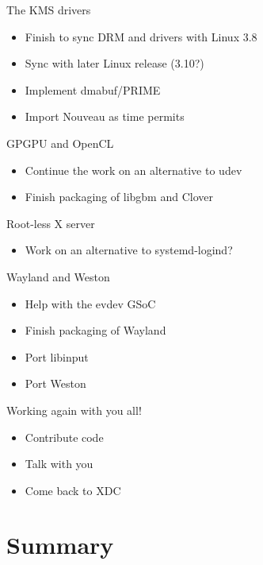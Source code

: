 \documentclass{beamer}
\begin{document}
\begin{frame}{The KMS drivers}
  \begin{itemize}
    \item Finish to sync DRM and drivers with Linux 3.8
    \item Sync with later Linux release (3.10?)
    \item Implement dmabuf/PRIME
    \item Import Nouveau as time permits
  \end{itemize}
\end{frame}

\begin{frame}{GPGPU and OpenCL}
  \begin{itemize}
    \item Continue the work on an alternative to udev
    \item Finish packaging of libgbm and Clover
  \end{itemize}
\end{frame}

\begin{frame}{Root-less X server}
  \begin{itemize}
    \item Work on an alternative to systemd-logind?
  \end{itemize}
\end{frame}

\begin{frame}{Wayland and Weston}
  \begin{itemize}
    \item Help with the evdev GSoC
    \item Finish packaging of Wayland
    \item Port libinput
    \item Port Weston
  \end{itemize}
\end{frame}

\begin{frame}{Working again with you all!}
  \begin{itemize}
    \item Contribute code
    \item Talk with you
    \item Come back to XDC
  \end{itemize}
\end{frame}

\section*{Summary}
\end{document}
